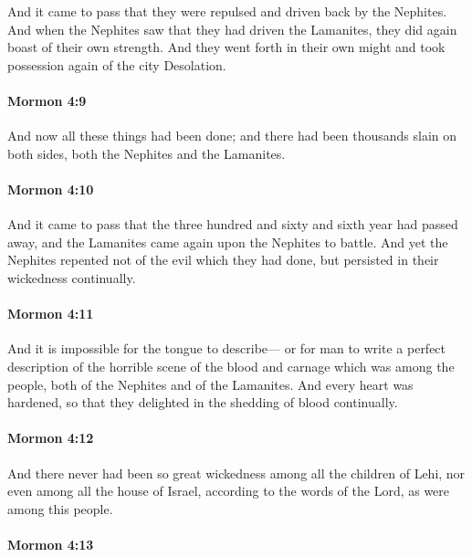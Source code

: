 			And it came to pass that they were repulsed and driven back by the Nephites.
			And when the Nephites saw that they had driven the Lamanites,
			they did again boast of their own strength.
			And they went forth in their own might
			and took possession again of the city Desolation.

		\paragraph{Mormon 4:9} %
			\label{MORMON-4-9}

			And now all these things had been done;
			and there had been thousands slain on both sides,
			both the Nephites and the Lamanites.

		\paragraph{Mormon 4:10} %
			\label{MORMON-4-10}

			And it came to pass that
			the three hundred and sixty and sixth year had passed away,
			and the Lamanites came again upon the Nephites to battle.
			And yet the Nephites repented not of the evil which they had done,
			but persisted in their wickedness continually.

		\paragraph{Mormon 4:11} %
			\label{MORMON-4-11}

			And it is impossible for the tongue to describe---
			or for man to write a perfect description
			of the horrible scene of the blood and carnage
			which was among the people, both of the Nephites and of the Lamanites.
			And every heart was hardened,
			so that they delighted in the shedding of blood continually.

		\paragraph{Mormon 4:12} %
			\label{MORMON-4-12}

			And there never had been so great wickedness among all the children of Lehi,
			nor even among all the house of Israel,
			according to the words of the Lord,
			as were among this people.

		\paragraph{Mormon 4:13} %
			\label{MORMON-4-13}

